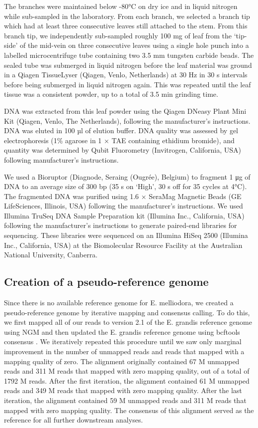 The branches were maintained below -80°C on dry ice and in liquid nitrogen while sub-sampled in the laboratory. From each branch, we selected a branch tip which had at least three consecutive leaves still attached to the stem. From this branch tip, we independently sub-sampled roughly 100 mg of leaf from the ‘tip-side' of the mid-vein on three consecutive leaves using a single hole punch into a labelled microcentrifuge tube containing two 3.5 mm tungsten carbide beads. The sealed tube was submerged in liquid nitrogen before the leaf material was ground in a Qiagen TissueLyser (Qiagen, Venlo, Netherlands) at 30 Hz in 30 s intervals before being submerged in liquid nitrogen again. This was repeated until the leaf tissue was a consistent powder, up to a total of 3.5 min grinding time.

DNA was extracted from this leaf powder using the Qiagen DNeasy Plant Mini Kit (Qiagen, Venlo, The Netherlands), following the manufacturer's instructions. DNA was eluted in 100 µl of elution buffer. DNA quality was assessed by gel electrophoresis (1\% agarose in 1 × TAE containing ethidium bromide), and quantity was determined by Qubit Fluorometry (Invitrogen, California, USA) following manufacturer's instructions.

We used a Bioruptor (Diagnode, Seraing (Ougrée), Belgium) to fragment 1 μg of DNA to an average size of 300 bp (35 s on ‘High', 30 s off for 35 cycles at 4°C). The fragmented DNA was purified using 1.6 × SeraMag Magnetic Beads (GE LifeSciences, Illinois, USA) following the manufacturer's instructions. We used Illumina TruSeq DNA Sample Preparation kit (Illumina Inc., California, USA) following the manufacturer's instructions to generate paired-end libraries for sequencing. These libraries were sequenced on an Illumina HiSeq 2500 (Illumina Inc., California, USA) at the Biomolecular Resource Facility at the Australian National University, Canberra.

\subsection{Creation of a pseudo-reference genome}

Since there is no available reference genome for E. melliodora, we created a pseudo-reference genome by iterative mapping and consensus calling. To do this, we first mapped all of our reads to version 2.1 of the E. grandis reference genome \parencite{bartholome_high-resolution_2015} using NGM \parencite{sedlazeck_nextgenmap_2013} and then updated the E. grandis reference genome using bcftools consensus \parencite{li_statistical_2011}. We iteratively repeated this procedure until we saw only marginal improvement in the number of unmapped reads and reads that mapped with a mapping quality of zero. The alignment originally contained 67 M unmapped reads and 311 M reads that mapped with zero mapping quality, out of a total of 1792 M reads. After the first iteration, the alignment contained 61 M unmapped reads and 349 M reads that mapped with zero mapping quality. After the last iteration, the alignment contained 59 M unmapped reads and 311 M reads that mapped with zero mapping quality. The consensus of this alignment served as the reference for all further downstream analyses.


